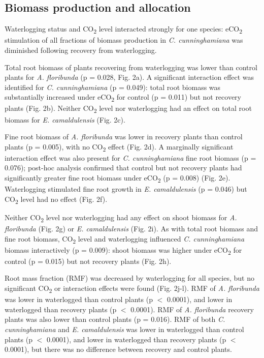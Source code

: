 \documentclass[12pt,a4paper]{memoir}
\begin{document}
\subsection*{Biomass production and allocation}
Waterlogging status and CO\textsubscript{2} level interacted strongly for one species: eCO\textsubscript{2} stimulation of all fractions of biomass production in \textit{C. cunninghamiana} was diminished following recovery from waterlogging. 

Total root biomass of plants recovering from waterlogging was lower than control plants for \textit{A. floribunda} (p = 0.028, Fig. 2a). A significant interaction effect was identified for \textit{C. cunninghamiana} (p = 0.049): total root biomass was substantially increased under eCO\textsubscript{2} for control (p = 0.011) but not recovery plants (Fig. 2b). Neither CO\textsubscript{2} level nor waterlogging had an effect on total root biomass for \textit{E. camaldulensis} (Fig. 2c). 

Fine root biomass of \textit{A. floribunda} was lower in recovery plants than control plants (p = 0.005), with no CO\textsubscript{2} effect (Fig. 2d). A marginally significant interaction effect was also present for \textit{C. cunninghamiana} fine root biomass (p = 0.076); post-hoc analysis confirmed that control but not recovery plants had significantly greater fine root biomass under eCO\textsubscript{2} (p = 0.008) (Fig. 2e). Waterlogging stimulated fine root growth in \textit{E. camaldulensis} (p = 0.046) but CO\textsubscript{2} level had no effect (Fig. 2f).

Neither CO\textsubscript{2} level nor waterlogging had any effect on shoot biomass for \textit{A. floribunda} (Fig. 2g) or \textit{E. camaldulensis} (Fig. 2i). As with total root biomass and fine root biomass, CO\textsubscript{2} level and waterlogging influenced \textit{C. cunninghamiana} biomass interactively (p = 0.009): shoot biomass was higher under eCO\textsubscript{2} for control (p = 0.015) but not recovery plants (Fig. 2h).

Root mass fraction (RMF) was decreased by waterlogging for all species, but no significant CO\textsubscript{2} or interaction effects were found (Fig. 2j-l). RMF of \textit{A. floribunda} was lower in waterlogged than control plants (p $<$ 0.0001), and lower in waterlogged than recovery plants (p $<$ 0.0001). RMF of \textit{A. floribunda} recovery plants was also lower than control plants (p = 0.016). RMF of both \textit{C. cunninghamiana} and \textit{E. camaldulensis} was lower in waterlogged than control plants (p $<$ 0.0001), and lower in waterlogged than recovery plants (p $<$ 0.0001), but there was no difference between recovery and control plants.
\end{document}
